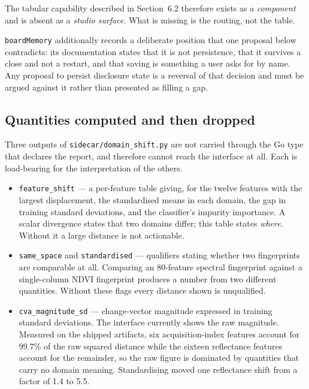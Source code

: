\documentclass[11pt,a4paper]{article}
\newcommand{\code}[1]{\texttt{\small #1}}
\begin{document}
The tabular capability described in Section~6.2 therefore exists as a
\emph{component} and is absent as a \emph{studio surface}. What is missing is
the routing, not the table.

\code{boardMemory} additionally records a deliberate position that one proposal
below contradicts: its documentation states that it is not persistence, that it
survives a close and not a restart, and that saving is something a user asks for
by name. Any proposal to persist disclosure state is a reversal of that
decision and must be argued against it rather than presented as filling a gap.

\subsection{Quantities computed and then dropped}

Three outputs of \code{sidecar/domain\_shift.py} are not carried through the
Go type that declares the report, and therefore cannot reach the interface at
all. Each is load-bearing for the interpretation of the others.

\begin{itemize}
\item \code{feature\_shift} --- a per-feature table giving, for the twelve
      features with the largest displacement, the standardised means in each
      domain, the gap in training standard deviations, and the classifier's
      impurity importance. A scalar divergence states that two domains differ;
      this table states \emph{where}. Without it a large distance is not
      actionable.
\item \code{same\_space} and \code{standardised} --- qualifiers stating whether
      two fingerprints are comparable at all. Comparing an 80-feature spectral
      fingerprint against a single-column NDVI fingerprint produces a number
      from two different quantities. Without these flags every distance shown
      is unqualified.
\item \code{cva\_magnitude\_sd} --- change-vector magnitude expressed in
      training standard deviations. The interface currently shows the raw
      magnitude. Measured on the shipped artifacts, six acquisition-index
      features account for 99.7\% of the raw squared distance while the sixteen
      reflectance features account for the remainder, so the raw figure is
      dominated by quantities that carry no domain meaning. Standardising moved
      one reflectance shift from a factor of 1.4 to 5.5.
\end{itemize}
\end{document}
